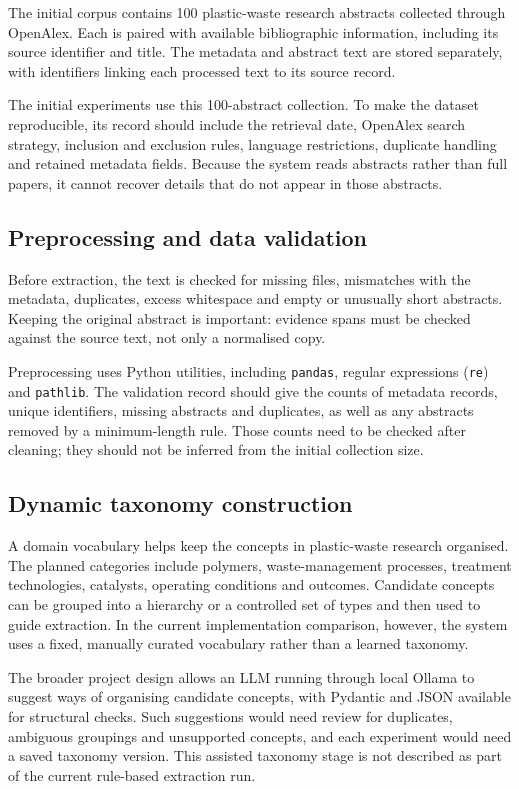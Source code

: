 \documentclass[11pt,a4paper]{article}
\begin{document}
The initial corpus contains 100 plastic-waste research abstracts collected through OpenAlex. Each is paired with available bibliographic information, including its source identifier and title. The metadata and abstract text are stored separately, with identifiers linking each processed text to its source record.

The initial experiments use this 100-abstract collection. To make the dataset reproducible, its record should include the retrieval date, OpenAlex search strategy, inclusion and exclusion rules, language restrictions, duplicate handling and retained metadata fields. Because the system reads abstracts rather than full papers, it cannot recover details that do not appear in those abstracts.

\subsection{Preprocessing and data validation}

Before extraction, the text is checked for missing files, mismatches with the metadata, duplicates, excess whitespace and empty or unusually short abstracts. Keeping the original abstract is important: evidence spans must be checked against the source text, not only a normalised copy.

Preprocessing uses Python utilities, including \texttt{pandas}, regular expressions (\texttt{re}) and \texttt{pathlib}. The validation record should give the counts of metadata records, unique identifiers, missing abstracts and duplicates, as well as any abstracts removed by a minimum-length rule. Those counts need to be checked after cleaning; they should not be inferred from the initial collection size.

\subsection{Dynamic taxonomy construction}

A domain vocabulary helps keep the concepts in plastic-waste research organised. The planned categories include polymers, waste-management processes, treatment technologies, catalysts, operating conditions and outcomes. Candidate concepts can be grouped into a hierarchy or a controlled set of types and then used to guide extraction. In the current implementation comparison, however, the system uses a fixed, manually curated vocabulary rather than a learned taxonomy.

The broader project design allows an LLM running through local Ollama to suggest ways of organising candidate concepts, with Pydantic and JSON available for structural checks. Such suggestions would need review for duplicates, ambiguous groupings and unsupported concepts, and each experiment would need a saved taxonomy version. This assisted taxonomy stage is not described as part of the current rule-based extraction run.
\end{document}
